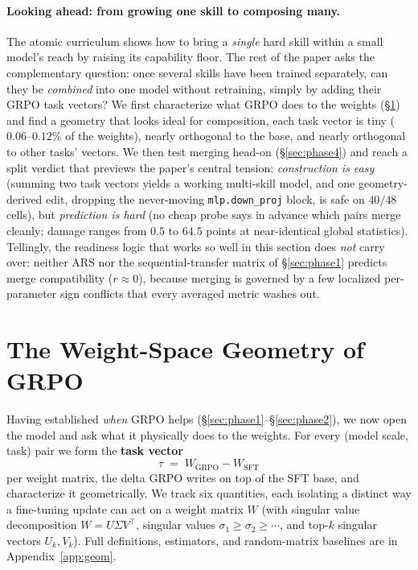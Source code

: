 \documentclass{article}
\newcommand{\tv}{\tau}
\newcommand{\Wsft}{W_{\mathrm{SFT}}}
\newcommand{\Wg}{W_{\mathrm{GRPO}}}
\begin{document}
\paragraph{Looking ahead: from growing one skill to composing many.} The atomic curriculum shows
how to bring a \emph{single} hard skill within a small model's reach by raising its capability
floor. The rest of the paper asks the complementary question: once several skills have been trained
separately, can they be \emph{combined} into one model without retraining, simply by adding their
GRPO task vectors? We first characterize what GRPO does to the weights (\S\ref{sec:phase3}) and find
a geometry that looks ideal for composition, each task vector is tiny ($0.06$--$0.12\%$ of the
weights), nearly orthogonal to the base, and nearly orthogonal to other tasks' vectors. We then test
merging head-on (\S\ref{sec:phase4}) and reach a split verdict that previews the paper's central
tension: \emph{construction is easy} (summing two task vectors yields a working multi-skill model,
and one geometry-derived edit, dropping the never-moving \texttt{mlp.down\_proj} block, is safe on
$40/48$ cells), but \emph{prediction is hard} (no cheap probe says in advance which pairs merge
cleanly; damage ranges from $0.5$ to $64.5$ points at near-identical global statistics). Tellingly,
the readiness logic that works so well in this section does \emph{not} carry over: neither ARS nor
the sequential-transfer matrix of \S\ref{sec:phase1} predicts merge compatibility ($r\approx 0$),
because merging is governed by a few localized per-parameter sign conflicts that every averaged
metric washes out.

\section{The Weight-Space Geometry of GRPO}
\label{sec:phase3}
Having established \emph{when} GRPO helps (\S\ref{sec:phase1}--\S\ref{sec:phase2}), we now open the
model and ask what it physically does to the weights. For every (model scale, task) pair we form the
\textbf{task vector}
$$\tv \;=\; \Wg - \Wsft$$
per weight matrix, the delta GRPO writes on top of the SFT base, and characterize it
geometrically. We track six quantities, each isolating a distinct way a fine-tuning update can act
on a weight matrix $W$ (with singular value decomposition $W=U\Sigma V^\top$, singular values
$\sigma_1\!\geq\!\sigma_2\!\geq\!\cdots$, and top-$k$ singular vectors $U_k,V_k$). Full definitions,
estimators, and random-matrix baselines are in Appendix~\ref{app:geom}.
\end{document}
